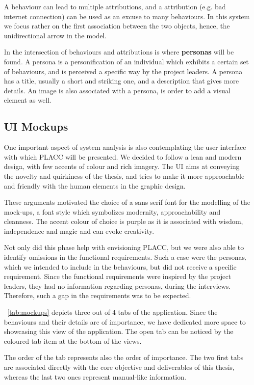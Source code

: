 A behaviour can lead to multiple attributions, and a attribution (e.g. bad internet connection) can be used as an excuse to many behaviours. In this system we focus rather on the first association between the two objects, hence, the unidirectional arrow in the model. 

In the intersection of behaviours and attributions is where \textbf{personas} will be found. A persona is a personification of an individual which exhibits a certain set of behaviours, and is perceived a specific way by the project leaders. A persona has a title, usually a short and striking one, and a description that gives more details. An image is also associated with a persona, is order to add a visual element as well.   

\subsection{UI Mockups}

One important aspect of system analysis is also contemplating the user interface with which PLACC will be presented.  We decided to follow a lean and modern design, with few accents of colour and rich imagery. The UI aims at conveying the novelty and quirkiness of the thesis,  and tries to make it more approachable and friendly with the human elements in the graphic design.

These arguments motivated the choice of a sans serif font for the modelling of the mock-ups,  a font style which symbolizes modernity, approachability and cleanness. The accent colour of choice is purple as it is associated with wisdom, independence and magic and can evoke creativity.

Not only did this phase help with envisioning PLACC, but we were also able to identify omissions in the functional requirements. Such a case were the personas, which we intended to include in the behaviours, but did not receive a specific requirement.  Since the functional requirements were inspired by the project leaders, they had no information regarding personas, during the interviews.  Therefore,  such a gap in the requirements was to be expected.

~\autoref{tab:mockups} depicts three out of 4 tabs of the application. Since the behaviours and their details are of importance, we have dedicated more space to showcasing this view of the application. The open tab can be noticed by the coloured tab item at the bottom of the views. 

The order of the tab represents also the order of importance. The two first tabs are associated directly with the core objective and deliverables of this thesis, whereas the last two ones represent manual-like information. 

